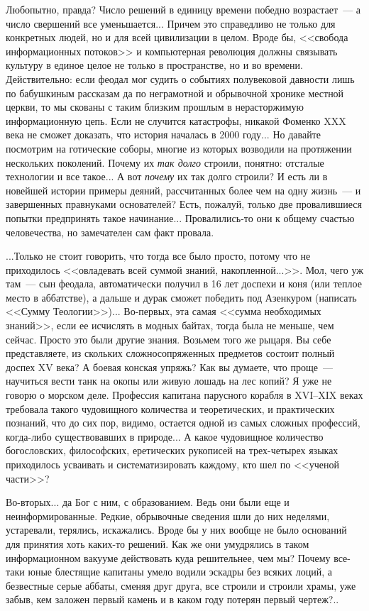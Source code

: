 \documentclass{scrbook}
\newcommand{\flqq}{<<}
\newcommand{\frqq}{>>}
\newcommand{\mdash}{~--- }
\newcommand{\ndash}{--}
\begin{document}
Любопытно, правда? Число решений в единицу времени победно возрастает{\mdash}а число свершений все уменьшается... Причем это справедливо не только для конкретных людей, но и для всей цивилизации в целом. Вроде бы, {\flqq}свобода информационных потоков{\frqq} и компьютерная революция должны связывать культуру в единое целое не только в пространстве, но и во времени. Действительно: если феодал мог судить о событиях полувековой давности лишь по бабушкиным рассказам да по неграмотной и обрывочной хронике местной церкви, то мы скованы с таким близким прошлым в нерасторжимую информационную цепь. Если не случится катастрофы, никакой Фоменко XXX века не сможет доказать, что история началась в 2000 году... Но давайте посмотрим на готические соборы, многие из которых возводили на протяжении нескольких поколений. Почему их \emph{так долго} строили, понятно: отсталые технологии и все такое... А вот \emph{почему} их так долго строили? И есть ли в новейшей истории примеры деяний, рассчитанных более чем на одну жизнь{\mdash}и завершенных правнуками основателей? Есть, пожалуй, только две провалившиеся попытки предпринять такое начинание... Провалились-то они к общему счастью человечества, но замечателен сам факт провала.

...Только не стоит говорить, что тогда все было просто, потому что не приходилось {\flqq}овладевать всей суммой знаний, накопленной...{\frqq}. Мол, чего уж там{\mdash}сын феодала, автоматически получил в 16 лет доспехи и коня (или теплое место в аббатстве), а дальше и дурак сможет победить под Азенкуром (написать {\flqq}Сумму Теологии{\frqq})... Во-первых, эта самая {\flqq}сумма необходимых знаний{\frqq}, если ее исчислять в модных байтах, тогда была не меньше, чем сейчас. Просто это были другие знания. Возьмем того же рыцаря. Вы себе представляете, из скольких сложносопряженных предметов состоит полный доспех XV века? А боевая конская упряжь? Как вы думаете, что проще{\mdash}научиться вести танк на окопы или живую лошадь на лес копий? Я уже не говорю о морском деле. Профессия капитана парусного корабля в XVI{\ndash}XIX веках требовала такого чудовищного количества и теоретических, и практических познаний, что до сих пор, видимо, остается одной из самых сложных профессий, когда-либо существовавших в природе... А какое чудовищное количество богословских, философских, еретических рукописей на трех-четырех языках приходилось усваивать и систематизировать каждому, кто шел по {\flqq}ученой части{\frqq}?

Во-вторых... да Бог с ним, с образованием. Ведь они были еще и неинформированные. Редкие, обрывочные сведения шли до них неделями, устаревали, терялись, искажались. Вроде бы у них вообще не было оснований для принятия хоть каких-то решений. Как же они умудрялись в таком информационном вакууме действовать куда решительнее, чем мы? Почему все-таки юные блестящие капитаны умело водили эскадры без всяких лоций, а безвестные серые аббаты, сменяя друг друга, все строили и строили храмы, уже забыв, кем заложен первый камень и в каком году потерян первый чертеж?..
\end{document}
